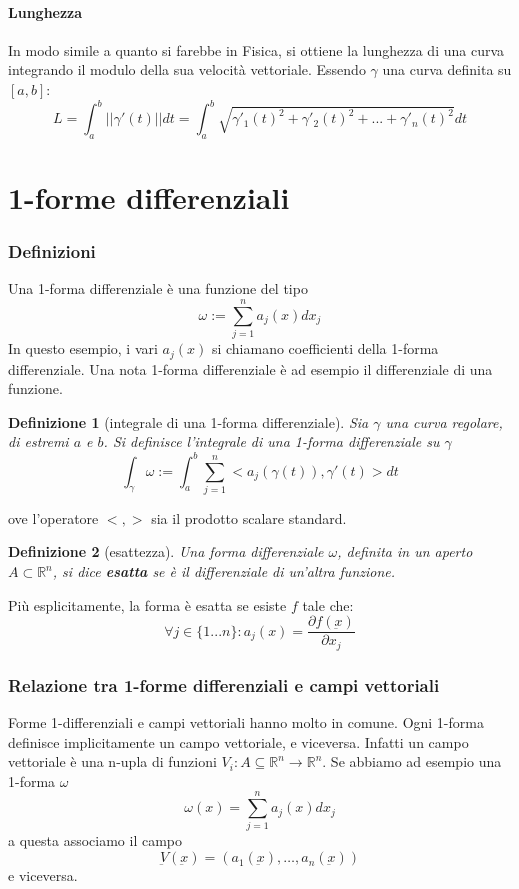 \documentclass[a4paper,12pt]{article}
\newtheorem{defi}{Definizione}
\begin{document}
\paragraph{Lunghezza}
In modo simile a quanto si farebbe in Fisica, si ottiene la lunghezza di una curva integrando il modulo della sua velocità vettoriale. Essendo $\gamma$ una curva definita su $[a, b]$:
$$L= \int_a^b ||\gamma'(t)|| dt = \int_a^b\sqrt{\gamma'_1(t)^2+\gamma'_2(t)^2+...+\gamma'_n(t)^2}dt$$


\section{1-forme differenziali}
\subsubsection{Definizioni}
Una 1-forma differenziale è una funzione del tipo
$$\omega := \sum_{j=1}^n a_j(x)dx_j$$
In questo esempio, i vari $a_j(x)$ si chiamano coefficienti della 1-forma differenziale.
Una nota 1-forma differenziale è ad esempio il differenziale di una funzione.
\begin{defi}[integrale di una 1-forma differenziale]
Sia $\gamma$ una curva regolare, di estremi $a$ e $b$.
Si definisce l'integrale di una 1-forma differenziale su $\gamma$
$$\int_\gamma \omega:=\int_a^b \sum_{j=1}^n <a_j(\gamma(t)), \gamma'(t)> dt$$
\end{defi}
ove l'operatore $<,>$ sia il prodotto scalare standard.

\begin{defi}[esattezza]
Una forma differenziale $\omega$, definita in un aperto $A\subset\mathbb{R}^n$, si dice \textbf{esatta} se è il differenziale di un'altra funzione.
\end{defi}
Più esplicitamente, la forma è esatta se esiste $f$ tale che:
$$\forall j\in\{1 ... n\}: a_j(x) = \frac{\partial f(\underbar{x})}{\partial x_j}$$
\subsubsection{Relazione tra 1-forme differenziali e campi vettoriali}

Forme 1-differenziali e campi vettoriali hanno molto in comune.
Ogni 1-forma definisce implicitamente un campo vettoriale, e viceversa. Infatti un campo vettoriale è una n-upla di funzioni $V_i:A\subseteq\mathbb{R}^n\rightarrow\mathbb{R}^n$.
Se abbiamo ad esempio una 1-forma $\omega$
$$\omega(x) = \sum_{j=1}^n a_j(x)dx_j$$
a questa associamo il campo
$$\underbar{V}(\underbar{x}) = (a_1(\underbar{x}), \dots, a_n(\underbar{x}))$$
e viceversa.
\end{document}
